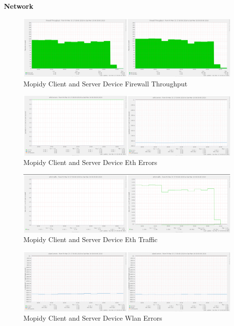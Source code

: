 \documentclass[11pt,a4paper,headinclude=false,footinclude=false]{scrreprt}
\begin{document}
\textbf{Network}

\begin{figure}[H]
\includegraphics{ResultsAndAnalysis/MopidyServerTestImages/012MopidyFirewallThroughput.png}
\centering
\caption{Mopidy Client and Server Device Firewall Throughput}
\label{MopidyFirewallThroughput}
\end{figure}

\begin{figure}[H]
\includegraphics{ResultsAndAnalysis/MopidyServerTestImages/010MopidyEth0Errors.png}
\centering
\caption{Mopidy Client and Server Device Eth Errors}
\label{MopidyEthError}
\end{figure}

\begin{figure}[H]
\includegraphics{ResultsAndAnalysis/MopidyServerTestImages/011MopidyEth0Traffic.png}
\centering
\caption{Mopidy Client and Server Device Eth Traffic}
\label{MopidyEthTraffic}
\end{figure}

\begin{figure}[H]
\includegraphics{ResultsAndAnalysis/MopidyServerTestImages/022MopidyWlan0Errors.png}
\centering
\caption{Mopidy Client and Server Device Wlan Errors}
\label{MopidyWlanError}
\end{figure}
\end{document}
